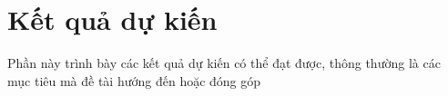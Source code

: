 \section{Kết quả dự kiến}
\label{results}

Phần này trình bày các kết quả dự kiến có thể đạt được, thông thường là các mục tiêu mà đề tài hướng đến hoặc đóng góp